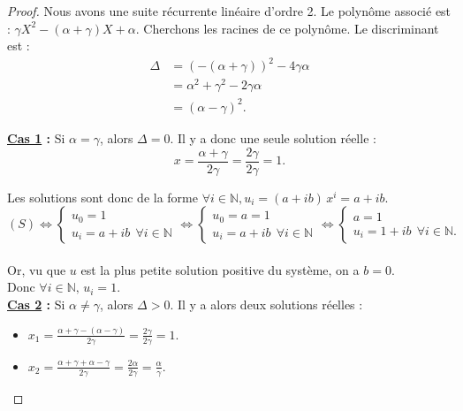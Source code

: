 \documentclass[12pt,a4paper]{report}
\theoremstyle{remark}
\begin{document}
\begin{proof}
\vspace{0.5cm}

Nous avons une suite récurrente linéaire d'ordre 2. Le polynôme associé est  : $\gamma X^2 -(\alpha+\gamma)X+\alpha$. Cherchons les racines de ce polynôme. Le discriminant est :
\begin{align*}
\Delta &= (-(\alpha+\gamma))^2 - 4\gamma \alpha \\
&=\alpha^2 + \gamma^2-2\gamma\alpha \\
&= (\alpha-\gamma)^2.
\end{align*}

\textbf{\underline{Cas 1} :} Si $\alpha = \gamma$, alors $\Delta = 0$. Il y a donc une seule solution réelle : 
$$x = \frac{\alpha + \gamma}{2 \gamma}=  \frac{2\gamma}{2\gamma} = 1.$$

Les solutions sont donc de la forme $\forall i \in \mathbb{N}, u_i = (a+ib) \, x^i = a+ib$.\\
$$(S) \iff \left\{
\begin{array}{ll}
        u_0=1\\
        u_i=a+ib \ \ \forall i \in \mathbb{N}
    \end{array}
\right. 
\iff \left\{
\begin{array}{ll}
        u_0=a=1\\
        u_i=a+ib \ \ \forall i \in \mathbb{N}
    \end{array}
    \right. 
\iff \left\{
\begin{array}{ll}
        a = 1\\
        u_i=1+ib \ \ \forall i \in \mathbb{N}.
    \end{array}
    \right.$$
\\
Or, vu que $u$ est la plus petite solution positive du système, on a $b=0$.\\
Donc $\forall i \in \mathbb{N}, \, u_i=1.$
\vspace{0.7cm}\\
\textbf{\underline{Cas 2} :} Si $\alpha \neq \gamma$, alors $\Delta > 0$. Il y a alors deux solutions réelles : 
\\
\begin{itemize}
\item $x_1 = \frac{\alpha + \gamma - (\alpha-\gamma)}{2\gamma}=\frac{2\gamma}{2\gamma}=1.$
\item $x_2= \frac{\alpha + \gamma + \alpha-\gamma}{2\gamma}=\frac{2\alpha}{2\gamma}=\frac{\alpha}{\gamma}.$
\end{itemize}
\vspace{0.5cm}

\end{proof}
\end{document}
